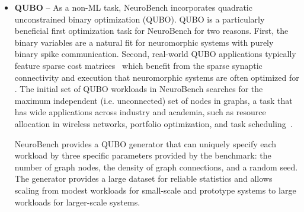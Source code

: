 \begin{itemize}
        

        \item \textbf{QUBO} -- %
        As a non-ML task, NeuroBench incorporates quadratic unconstrained binary optimization (QUBO). QUBO is a particularly beneficial first optimization task for NeuroBench for two reasons. First, the binary variables are a natural fit for neuromorphic systems with purely binary spike communication. Second, real-world QUBO applications typically feature sparse cost matrices~\cite{koch2022} which benefit from the sparse synaptic connectivity and execution that neuromorphic systems are often optimized for \cite{Aimone2022}. The initial set of QUBO workloads in NeuroBench searches for the maximum independent (i.e. unconnected) set of nodes in graphs, a task that has wide applications across industry and academia, such as resource allocation in wireless networks, portfolio optimization, and task scheduling~\cite{wurtz2024industryapplicationsneutralatomquantum}.
        
        NeuroBench provides a QUBO generator that can uniquely specify each workload by three specific parameters provided by the benchmark: the number of graph nodes, the density of graph connections, and a random seed. The generator provides a large dataset for reliable statistics and allows scaling from modest workloads for small-scale and prototype systems to large workloads for larger-scale systems. 


\end{itemize}
